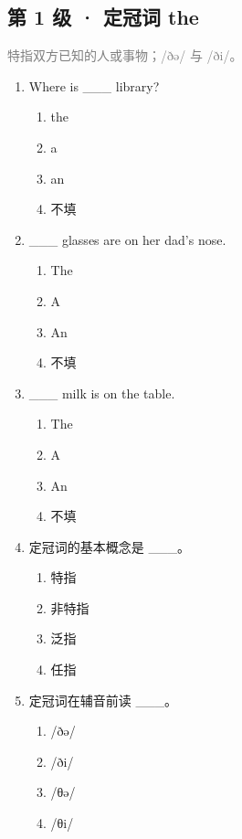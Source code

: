 \documentclass[11pt,a4paper]{ctexart}
\begin{document}
\subsection*{第 1 级 · 定冠词 the}
\noindent\textcolor{gray}{特指双方已知的人或事物；/ðə/ 与 /ði/。}\par\smallskip
\begin{enumerate}[leftmargin=*,itemsep=4pt]
\item Where is \_\_\_ library?
\begin{enumerate}[label=\Alph*.,leftmargin=2em,itemsep=1pt,topsep=2pt]
\item the
\item a
\item an
\item 不填
\end{enumerate}
\item \_\_\_ glasses are on her dad’s nose.
\begin{enumerate}[label=\Alph*.,leftmargin=2em,itemsep=1pt,topsep=2pt]
\item The
\item A
\item An
\item 不填
\end{enumerate}
\item \_\_\_ milk is on the table.
\begin{enumerate}[label=\Alph*.,leftmargin=2em,itemsep=1pt,topsep=2pt]
\item The
\item A
\item An
\item 不填
\end{enumerate}
\item 定冠词的基本概念是 \_\_\_。
\begin{enumerate}[label=\Alph*.,leftmargin=2em,itemsep=1pt,topsep=2pt]
\item 特指
\item 非特指
\item 泛指
\item 任指
\end{enumerate}
\item 定冠词在辅音前读 \_\_\_。
\begin{enumerate}[label=\Alph*.,leftmargin=2em,itemsep=1pt,topsep=2pt]
\item /ðə/
\item /ði/
\item /θə/
\item /θi/
\end{enumerate}

\end{enumerate}
\end{document}
